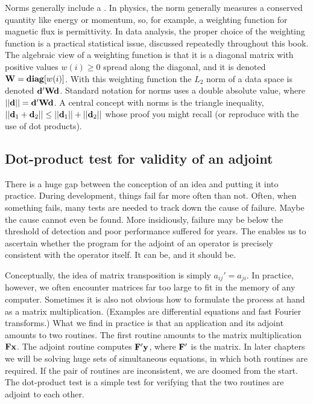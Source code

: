 \par
Norms generally include a .
In physics,
the norm generally measures a conserved quantity
like energy or momentum,
so, for example,
a weighting function for magnetic flux is permittivity.
In data analysis,
the proper choice of the weighting function is
a practical statistical issue,
discussed repeatedly throughout this book.
The algebraic view of a weighting function is that
it is a diagonal matrix
with positive values $w(i)\ge 0$ spread along the diagonal,
and it is denoted $\bold W = {\bf diag}[w(i)]$.
With this weighting function
the $L_2$ norm of a data space is denoted
$\bold d' \bold W \bold d$.
Standard notation for norms uses a double absolute value,
where $||\bold d||=\bold d' \bold W \bold d$.
A central concept with norms is the triangle inequality,
$ ||\bold d_1   +   \bold d_2|| \le ||\bold d_1|| + ||\bold d_2|| $
whose proof you might recall (or reproduce with the use of dot products).

\subsection{Dot-product test for validity of an adjoint}
\par
There is a huge gap between the
conception of an idea and putting it into practice.
During development, things fail far more often than not.
Often, when something fails,
many tests are needed to track down the cause of failure.
Maybe the cause cannot even be found.
More insidiously, failure may be below the threshold of detection
and poor performance suffered for years.
The 
enables us to ascertain whether
the program for the adjoint of an operator
is precisely consistent with the operator itself.
It can be, and it should be.

\par
Conceptually, the idea of matrix transposition is simply ${a}_{ij}'=a_{ji}$.
In practice, however, we often encounter matrices far too large
to fit in the memory of any computer.
Sometimes it is also not obvious how to formulate the process at hand
as a matrix multiplication.
(Examples are differential equations and fast Fourier transforms.)
What we find in practice is that an application and its adjoint 
amounts to two routines. The first routine
amounts to the matrix multiplication $ \bold F \bold x$.
The adjoint routine computes $\bold F' \bold y$,
where $\bold F'$ is the  matrix.
In later chapters we will be solving huge sets of simultaneous equations,
in which both routines are required.
If the pair of routines are inconsistent,
we are doomed from the start.
The dot-product test is a simple test for verifying that the two 
routines are adjoint to each other.

